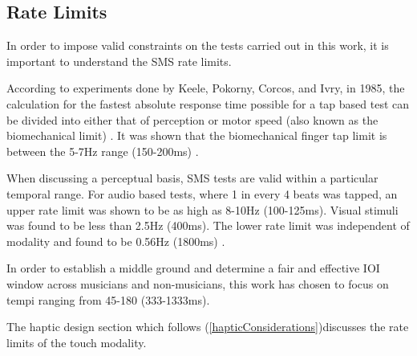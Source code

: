 \subsection{Rate Limits} \label{rateLimits}
In order to impose valid constraints on the tests carried out in this work, it is important to understand the SMS rate limits. 

According to experiments done by Keele, Pokorny, Corcos, and Ivry, in 1985, the calculation for the fastest absolute response time possible for a tap based test can be divided into either that of perception or motor speed (also known as the biomechanical limit) \cite{keele1985perception}. It was shown that the biomechanical finger tap limit is between the 5-7Hz range (150-200ms) \cite{repp2006rate}.

When discussing a perceptual basis, SMS tests are valid within a particular temporal range. For audio based tests, where 1 in every 4 beats was tapped, an upper rate limit was shown to be as high as 8-10Hz (100-125ms). Visual stimuli was found to be less than 2.5Hz (400ms). The lower rate limit was independent of modality and found to be 0.56Hz (1800ms) \cite{repp2006rate}. 

In order to establish a middle ground and determine a fair and effective IOI window across musicians and non-musicians, this work has chosen to focus on tempi ranging from 45-180 (333-1333ms).

The haptic design section which follows (\ref{hapticConsiderations})discusses the rate limits of the touch modality.